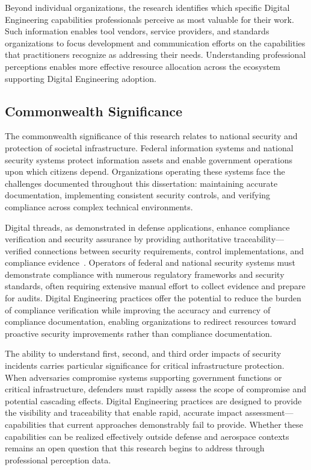 Beyond individual organizations, the research identifies which specific Digital Engineering capabilities professionals perceive as most valuable for their work. Such information enables tool vendors, service providers, and standards organizations to focus development and communication efforts on the capabilities that practitioners recognize as addressing their needs. Understanding professional perceptions enables more effective resource allocation across the ecosystem supporting Digital Engineering adoption.

\subsection{Commonwealth Significance}

The commonwealth significance of this research relates to national security and protection of societal infrastructure. Federal information systems and national security systems protect information assets and enable government operations upon which citizens depend. Organizations operating these systems face the challenges documented throughout this dissertation: maintaining accurate documentation, implementing consistent security controls, and verifying compliance across complex technical environments.

Digital threads, as demonstrated in defense applications, enhance compliance verification and security assurance by providing authoritative traceability---verified connections between security requirements, control implementations, and compliance evidence~\parencite{DoD_DE_Strategy_2018}. Operators of federal and national security systems must demonstrate compliance with numerous regulatory frameworks and security standards, often requiring extensive manual effort to collect evidence and prepare for audits. Digital Engineering practices offer the potential to reduce the burden of compliance verification while improving the accuracy and currency of compliance documentation, enabling organizations to redirect resources toward proactive security improvements rather than compliance documentation.

The ability to understand first, second, and third order impacts of security incidents carries particular significance for critical infrastructure protection. When adversaries compromise systems supporting government functions or critical infrastructure, defenders must rapidly assess the scope of compromise and potential cascading effects. Digital Engineering practices are designed to provide the visibility and traceability that enable rapid, accurate impact assessment---capabilities that current approaches demonstrably fail to provide. Whether these capabilities can be realized effectively outside defense and aerospace contexts remains an open question that this research begins to address through professional perception data.

